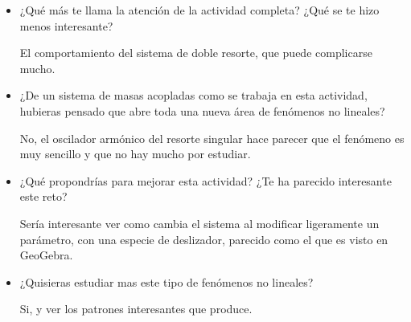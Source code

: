 \documentclass[a4paper]{article}
\begin{document}
\begin{itemize}
\item     ¿Qué más te llama la atención de la actividad completa? ¿Qué se te hizo menos interesante?

El comportamiento del sistema de doble resorte, que puede complicarse mucho.

\item     ¿De un sistema de masas acopladas como se trabaja en esta actividad, hubieras pensado que abre toda una nueva área de fenómenos no lineales?

No, el oscilador armónico del resorte singular hace parecer que el fenómeno es muy sencillo y que no hay mucho por estudiar.

\item     ¿Qué propondrías para mejorar esta actividad? ¿Te ha parecido interesante este reto?

Sería interesante ver como cambia el sistema al modificar ligeramente un parámetro, con una especie de deslizador, parecido como el que es visto en GeoGebra.

\item     ¿Quisieras estudiar mas este tipo de fenómenos no lineales?

Si, y ver los patrones interesantes que produce.

\end{itemize}
\end{document}
